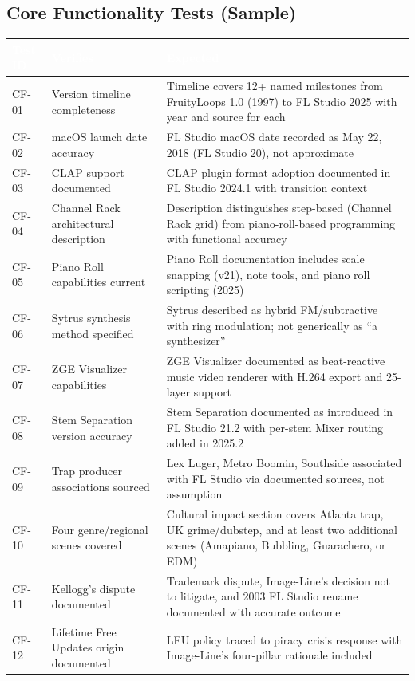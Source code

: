 \documentclass[11pt,letterpaper]{article}
\newcommand{\tableheader}[1]{\textbf{\sffamily\textcolor{white}{#1}}}
\begin{document}
\subsection{Core Functionality Tests (Sample)}

\begin{center}
\begin{tabularx}{\textwidth}{C{1.5cm}L{4cm}X}
\toprule
{}
\tableheader{Test ID} & \tableheader{Verifies} & \tableheader{Expected} \\
\midrule
CF-01 & Version timeline completeness & Timeline covers 12+ named milestones from FruityLoops 1.0 (1997) to FL Studio 2025 with year and source for each \\
CF-02 & macOS launch date accuracy & FL Studio macOS date recorded as May 22, 2018 (FL Studio 20), not approximate \\
CF-03 & CLAP support documented & CLAP plugin format adoption documented in FL Studio 2024.1 with transition context \\
CF-04 & Channel Rack architectural description & Description distinguishes step-based (Channel Rack grid) from piano-roll-based programming with functional accuracy \\
CF-05 & Piano Roll capabilities current & Piano Roll documentation includes scale snapping (v21), note tools, and piano roll scripting (2025) \\
CF-06 & Sytrus synthesis method specified & Sytrus described as hybrid FM/subtractive with ring modulation; not generically as ``a synthesizer'' \\
CF-07 & ZGE Visualizer capabilities & ZGE Visualizer documented as beat-reactive music video renderer with H.264 export and 25-layer support \\
CF-08 & Stem Separation version accuracy & Stem Separation documented as introduced in FL Studio 21.2 with per-stem Mixer routing added in 2025.2 \\
CF-09 & Trap producer associations sourced & Lex Luger, Metro Boomin, Southside associated with FL Studio via documented sources, not assumption \\
CF-10 & Four genre/regional scenes covered & Cultural impact section covers Atlanta trap, UK grime/dubstep, and at least two additional scenes (Amapiano, Bubbling, Guarachero, or EDM) \\
CF-11 & Kellogg's dispute documented & Trademark dispute, Image-Line's decision not to litigate, and 2003 FL Studio rename documented with accurate outcome \\
CF-12 & Lifetime Free Updates origin documented & LFU policy traced to piracy crisis response with Image-Line's four-pillar rationale included \\
\bottomrule
\end{tabularx}
\end{center}
\end{document}
